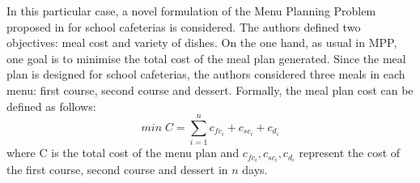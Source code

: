 In this particular case, a novel formulation of the Menu Planning Problem proposed in \cite{Miranda2018} for school cafeterias is considered. The authors defined two objectives: meal cost and variety of dishes.
On the one hand, as usual in MPP, one goal is to minimise the total cost of the meal plan generated. Since the meal plan is designed for school cafeterias, the authors considered three meals in each menu: first course, second course and dessert. Formally, the meal plan cost can be defined as follows:
\[
    min\; C = \sum_{i=1}^{n}{c_{fc_{i}} + c_{sc_{i}} + c_{d_{i}}}
\]
where C is the total cost of the menu plan and $c_{fc_{i}}, c_{sc_{i}}, c_{d_{i}}$ represent the cost of the first course, second course and dessert in $n$ days.

